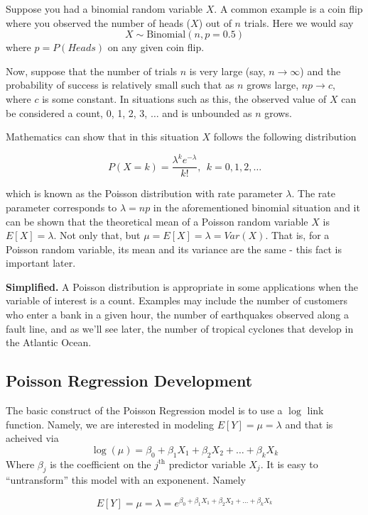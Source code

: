\documentclass[
]{book}
\begin{document}
Suppose you had a binomial random variable \(X\). A common example is a coin flip where you observed the number of heads (\(X\)) out of \(n\) trials. Here we would say
\[X \sim \textrm{Binomial}(n, p=0.5)\]
where \(p=P(Heads)\) on any given coin flip.

Now, suppose that the number of trials \(n\) is very large (say, \(n\to\infty\)) and the probability of success is relatively small such that as \(n\) grows large, \(np\to c\), where \(c\) is some constant. In situations such as this, the observed value of \(X\) can be considered a count, 0, 1, 2, 3, \(\ldots\) and is unbounded as \(n\) grows.

Mathematics can show that in this situation \(X\) follows the following distribution

\[P(X=k) = \frac{\lambda^k e^{-\lambda}}{k!}, ~~k=0,1,2,\ldots\]

which is known as the Poisson distribution with rate parameter \(\lambda\). The rate parameter corresponds to \(\lambda=np\) in the aforementioned binomial situation and it can be shown that the theoretical mean of a Poisson random variable \(X\) is \(E[X]=\lambda\). Not only that, but \(\mu=E[X]=\lambda = Var(X)\). That is, for a Poisson random variable, its mean and its variance are the same - this fact is important later.

\textbf{Simplified.} A Poisson distribution is appropriate in some applications when the variable of interest is a count. Examples may include the number of customers who enter a bank in a given hour, the number of earthquakes observed along a fault line, and as we'll see later, the number of tropical cyclones that develop in the Atlantic Ocean.

\hypertarget{poisson-regression-development}{%
\subsection{Poisson Regression Development}\label{poisson-regression-development}}

The basic construct of the Poisson Regression model is to use a \(\log\) link function. Namely, we are interested in modeling \(E[Y] = \mu = \lambda\) and that is acheived via
\[\log(\mu) = \beta_0 + \beta_1 X_1 + \beta_2 X_2 + \ldots + \beta_k X_k\]
Where \(\beta_j\) is the coefficient on the \(j^\mathrm{th}\) predictor variable \(X_j\). It is easy to ``untransform'' this model with an exponenent. Namely

\begin{equation}
E[Y] = \mu = \lambda = e^{\beta_0 + \beta_1 X_1 + \beta_2 X_2 + \ldots + \beta_k X_k}
\label{eq:poissonModel}
\end{equation}
\end{document}
